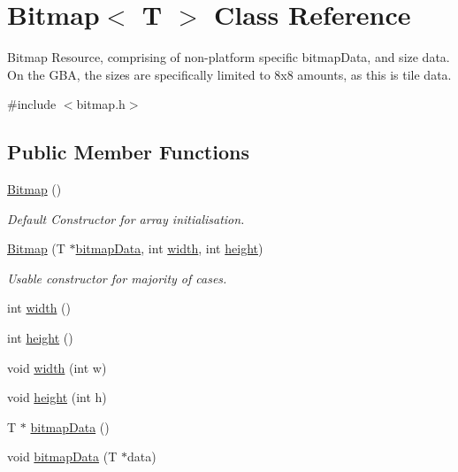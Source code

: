 \hypertarget{class_bitmap_3_01_t_01_4}{\section{Bitmap$<$ T $>$ Class Reference}
\label{class_bitmap_3_01_t_01_4}
}


Bitmap Resource, comprising of non-\/platform specific bitmap\-Data, and size data. On the G\-B\-A, the sizes are specifically limited to 8x8 amounts, as this is tile data.  




{\ttfamily \#include $<$bitmap.\-h$>$}

\subsection*{Public Member Functions}
\begin{DoxyCompactItemize}
\item 
\hypertarget{class_bitmap_3_01_t_01_4_a639b3eb5055babcb2a24c1fc84539cb4}{\hyperlink{class_bitmap_3_01_t_01_4_a639b3eb5055babcb2a24c1fc84539cb4}{Bitmap} ()}\label{class_bitmap_3_01_t_01_4_a639b3eb5055babcb2a24c1fc84539cb4}

\begin{DoxyCompactList}\small\item\em Default Constructor for array initialisation. \end{DoxyCompactList}\item 
\hypertarget{class_bitmap_3_01_t_01_4_a87c905c83a3d6241363d10f32c97b5ac}{\hyperlink{class_bitmap_3_01_t_01_4_a87c905c83a3d6241363d10f32c97b5ac}{Bitmap} (T $\ast$\hyperlink{class_bitmap_3_01_t_01_4_ae6775d0558eb794f625b3353abd52dac}{bitmap\-Data}, int \hyperlink{class_bitmap_3_01_t_01_4_aa9d9619b37ce2339ee1db4c4a3068fcb}{width}, int \hyperlink{class_bitmap_3_01_t_01_4_a08ed36c28aedf05e2cb37cc73fe77022}{height})}\label{class_bitmap_3_01_t_01_4_a87c905c83a3d6241363d10f32c97b5ac}

\begin{DoxyCompactList}\small\item\em Usable constructor for majority of cases. \end{DoxyCompactList}\item 
int \hyperlink{class_bitmap_3_01_t_01_4_aa9d9619b37ce2339ee1db4c4a3068fcb}{width} ()
\item 
int \hyperlink{class_bitmap_3_01_t_01_4_a08ed36c28aedf05e2cb37cc73fe77022}{height} ()
\item 
void \hyperlink{class_bitmap_3_01_t_01_4_a1b469bd5c8f4ecc1ada64e67a4892ed1}{width} (int w)
\item 
void \hyperlink{class_bitmap_3_01_t_01_4_ad848451ebb0a8ed1386012e98b6b5374}{height} (int h)
\item 
T $\ast$ \hyperlink{class_bitmap_3_01_t_01_4_ae6775d0558eb794f625b3353abd52dac}{bitmap\-Data} ()
\item 
void \hyperlink{class_bitmap_3_01_t_01_4_a0b930d95addaa750b52efb8cc308de81}{bitmap\-Data} (T $\ast$data)
\end{DoxyCompactItemize}


